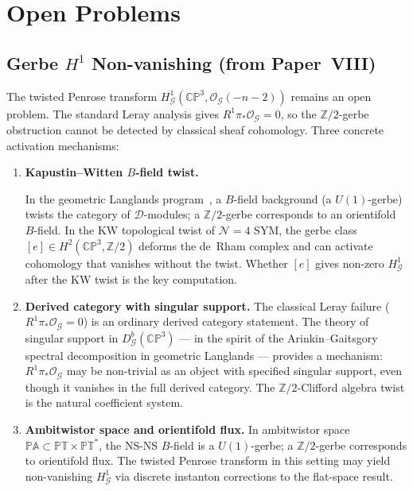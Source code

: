 \documentclass[11pt,a4paper]{article}
\theoremstyle{remark}
\newcommand{\CP}{\mathbb{CP}}
\newcommand{\Z}{\mathbb{Z}}
\newcommand{\cO}{\mathcal{O}}
\begin{document}
\section{Open Problems}
\label{sec:open-problems}

\subsection{Gerbe $H^1$ Non-vanishing (from Paper~VIII)}

The twisted Penrose transform
$H^1_{\mathcal{G}}(\CP^3, \cO_{\mathcal{G}}(-n-2))$ remains an open
problem. The standard Leray analysis gives $R^1\pi_*\cO_{\mathcal{G}} = 0$,
so the $\Z/2$-gerbe obstruction cannot be detected by classical sheaf
cohomology. Three concrete activation mechanisms:

\begin{enumerate}
  \item \textbf{Kapustin--Witten $B$-field twist.}
    {\sloppy In the geometric Langlands program~\cite{KapustinWitten2007},
    a $B$-field background (a $U(1)$-gerbe) twists the category
    of $\mathcal{D}$-modules; a $\Z/2$-gerbe corresponds to an
    orientifold $B$-field. In the KW topological twist of
    $\mathcal{N}=4$ SYM, the gerbe class $[e] \in H^2(\CP^3, \Z/2)$
    deforms the de~Rham complex and can activate cohomology that
    vanishes without the twist. Whether $[e]$ gives non-zero
    $H^1_{\mathcal{G}}$ after the KW twist is the key computation.\par}

  \item \textbf{Derived category with singular support.}
    The classical Leray failure ($R^1\pi_*\cO_{\mathcal{G}} = 0$) is an
    ordinary derived category statement. The theory of singular support
    in $D^b_{\mathcal{G}}(\CP^3)$ --- in the spirit of the Arinkin--Gaitsgory
    spectral decomposition in geometric Langlands --- provides a mechanism:
    $R^1\pi_*\cO_{\mathcal{G}}$ may be non-trivial as an object with
    specified singular support, even though it vanishes in the full
    derived category. The $\Z/2$-Clifford algebra twist is the natural
    coefficient system.

  \item \textbf{Ambitwistor space and orientifold flux.}
    In ambitwistor space $\mathbb{PA} \subset \mathbb{PT} \times \mathbb{PT}^*$,
    the NS-NS $B$-field is a $U(1)$-gerbe; a $\Z/2$-gerbe corresponds to
    orientifold flux. The twisted Penrose transform in this setting may
    yield non-vanishing $H^1_{\mathcal{G}}$ via discrete instanton
    corrections to the flat-space result.
\end{enumerate}
\end{document}
